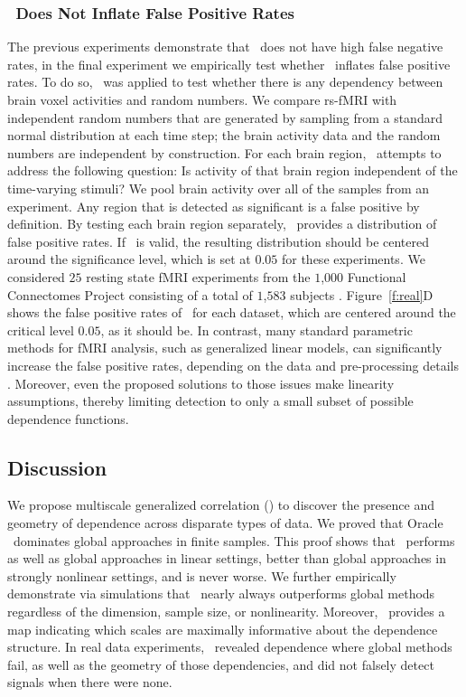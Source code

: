 \documentclass[11pt]{article}
\begin{document}
\subsubsection*{\Mgc~Does Not Inflate False Positive Rates} 

The previous experiments demonstrate that \Mgc~does not have high false negative rates, in the final experiment we empirically test whether \Mgc~inflates false positive rates. To do so, \Mgc~was applied to test whether there is any dependency between brain voxel activities and random numbers.
We compare rs-fMRI with independent random numbers that are generated by sampling from a standard normal distribution at each time step; the brain activity data and the random numbers are independent by construction.
For each brain region, \Mgc~attempts to address the following question: Is activity of that  brain region independent of the time-varying stimuli? We pool brain activity over all of the samples from an experiment.
Any region that is detected as significant is a false positive by definition.  By testing each brain region separately, \Mgc~provides a distribution of false positive rates.  If \Mgc~is valid, the resulting distribution should be centered around the significance level, which is set at $0.05$ for these experiments.
% 
We considered $25$ resting state fMRI experiments from the $1$,$000$ Functional Connectomes Project  consisting of a total of $1$,$583$ subjects \cite{biswal2010toward}.
Figure~\ref{f:real}{\color{magenta}D} shows the false positive rates of  \Mgc~for each dataset, which are centered around the critical level $0.05$, as it should be.
In contrast, many standard parametric methods for fMRI analysis, such as generalized linear models, can significantly increase the false positive rates, depending on the data and pre-processing details \cite{EklundKnutsson2012,Eklund2015}. Moreover, even the proposed solutions to those issues make linearity assumptions, thereby limiting detection to only a small subset of possible dependence functions.

\subsection*{Discussion}
\label{conclu}

We propose multiscale generalized correlation (\Mgc) to discover the presence and geometry of dependence across disparate types of data.
We proved that Oracle \Mgc~dominates global approaches in finite samples.  This proof shows that \Mgc~performs as well as global approaches in linear settings, better than global approaches in strongly nonlinear settings, and is never worse. We further empirically demonstrate via simulations that \Mgc~nearly always outperforms global methods regardless of the dimension, sample size, or nonlinearity.  Moreover, \Mgc~provides a map indicating which scales are maximally informative about the dependence structure. 
In real data experiments, \Mgc~revealed dependence where global methods fail, as well as the geometry of those dependencies, and did not falsely detect signals when there were none. 
\end{document}
